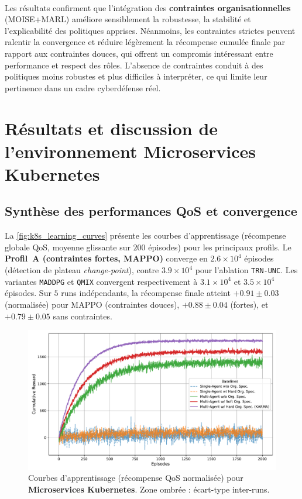 \

Les résultats confirment que l’intégration des \textbf{contraintes organisationnelles} (MOISE+MARL) améliore sensiblement la robustesse, la stabilité et l’explicabilité des politiques apprises.
Néanmoins, les contraintes strictes peuvent ralentir la convergence et réduire légèrement la récompense cumulée finale par rapport aux contraintes douces, qui offrent un compromis intéressant entre performance et respect des rôles.
L’absence de contraintes conduit à des politiques moins robustes et plus difficiles à interpréter, ce qui limite leur pertinence dans un cadre cyberdéfense réel.


\section{Résultats et discussion de l'environnement \textbf{Microservices Kubernetes}}\label{sec:results_and_discussion_ms}

\subsection*{Synthèse des performances QoS et convergence}

La \autoref{fig:k8s_learning_curves} présente les courbes d’apprentissage (récompense globale QoS, moyenne glissante sur $200$ épisodes) pour les principaux profils.
Le \textbf{Profil~A (contraintes fortes, MAPPO)} converge en $2.6\times 10^4$ épisodes (détection de plateau \emph{change-point}), contre $3.9\times 10^4$ pour l’ablation \texttt{TRN-UNC}.
Les variantes \texttt{MADDPG} et \texttt{QMIX} convergent respectivement à $3.1\times 10^4$ et $3.5\times 10^4$ épisodes.
Sur $5$ runs indépendants, la récompense finale atteint $+0.91 \pm 0.03$ (normalisée) pour MAPPO (contraintes douces), $+0.88 \pm 0.04$ (fortes), et $+0.79 \pm 0.05$ sans contraintes.

\begin{figure}[h!]
  \centering
  \includegraphics[width=0.75\linewidth]{figures/results_k8s_learning.pdf}
  \caption{Courbes d’apprentissage (récompense QoS normalisée) pour \textbf{Microservices Kubernetes}. Zone ombrée : écart-type inter-runs.}
  \label{fig:k8s_learning_curves}
\end{figure}

